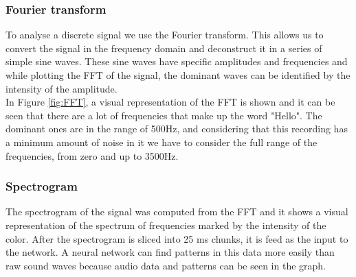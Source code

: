 
\subsubsection{ Fourier transform}

To analyse a discrete signal we use the Fourier transform. This allows us to convert the signal in the frequency domain and deconstruct it in a series of simple sine waves. These sine waves have specific amplitudes and frequencies and while plotting the FFT of the signal, the dominant waves can be identified by the intensity of the amplitude.\\

In Figure \ref{fig:FFT}, a visual representation of the FFT is shown and it can be seen that there are a lot of frequencies that make up the word "Hello". The dominant ones are in the range of 500Hz, and considering that this recording has a minimum amount of noise in it we have to consider the full range of the frequencies, from zero and up to 3500Hz.



\subsubsection{ Spectrogram}

The spectrogram of the signal was computed from the FFT and it shows a visual representation of the spectrum of frequencies marked by the intensity of the color. After the spectrogram is sliced into 25 ms chunks, it is feed as the input to the network. A neural network can find patterns in this data more easily than raw sound waves because audio data and patterns can be seen in the graph.

